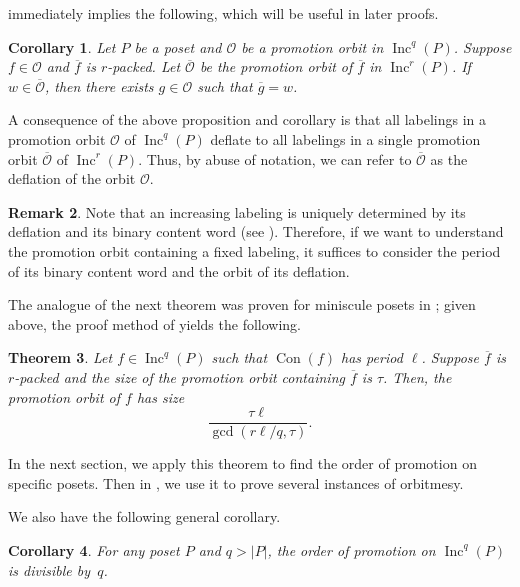 \documentclass[11pt]{amsart}
\newtheorem{theorem}{Theorem}[section]
\newtheorem{corollary}[theorem]{Corollary}
\theoremstyle{definition}
\newtheorem{remark}[theorem]{Remark}
\DeclareMathOperator{\Inc}{\mathrm{Inc}}
\DeclareMathOperator{\Con}{\mathrm{Con}}
\begin{document}
 immediately implies the following, which will be useful in later proofs.

\begin{corollary}\label{cor:can-find-lift}
    Let $P$ be a poset and $\mathcal{O}$ be a promotion orbit in $\Inc^q(P)$.  Suppose $f\in \mathcal{O}$ and $\overline{f}$ is $r$-packed.  Let $\overline{\mathcal{O}}$ be the promotion orbit of $\overline{f}$ in $\Inc^r(P)$. If $w\in \overline{\mathcal{O}}$, then there exists $g\in \mathcal{O}$ such that $\overline{g}=w$.
\end{corollary}

A consequence of the above proposition and corollary is that all labelings in a promotion orbit $\mathcal{O}$ of $\Inc^q(P)$ deflate to all labelings in a single promotion orbit $\overline{\mathcal{O}}$ of $\Inc^r(P)$.  Thus, by abuse of notation, we can refer to $\overline{\mathcal{O}}$ as the deflation of the orbit $\mathcal{O}$.

\begin{remark}\label{remark:defl_con}
Note that an increasing labeling is uniquely determined by its deflation and its binary content word (see \cite[Proposition 4.2]{mandel2018orbits}).  Therefore, if we want to understand the promotion orbit containing a fixed labeling, it suffices to consider the period of its binary content word and the orbit of its deflation.
\end{remark}

The analogue of the next theorem was proven for miniscule posets in \cite[Theorem 6.1]{mandel2018orbits}; given  above, the proof method of \cite[Theorem 6.1]{mandel2018orbits} yields the following. 
\begin{theorem}\label{thm:OrderComparedToDeflation}
Let $f \in \Inc^q(P)$ such that $\Con(f)$ has period $\ell$. Suppose $\overline{f}$ is $r$-packed and  
the size of the promotion orbit containing $\overline{f}$ is $\tau$. Then, the promotion orbit of $f$ has size \[
\frac{\tau \ell}{\gcd(r\ell/q,\tau)}.
\]
\end{theorem}
In the next section, we apply this theorem to find the order of promotion on specific posets. Then in , we use it to prove several instances of orbitmesy.

We also have the following general corollary.
\begin{corollary}\label{cor:Divisible}
    For any poset $P$ and $q>|P|$, the order of promotion on $\Inc^q(P)$ is divisible by~$q$.
\end{corollary}
\end{document}
